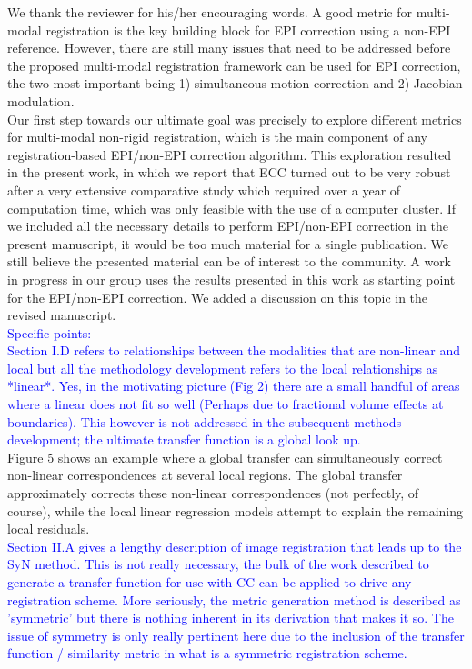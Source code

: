 \documentclass[onecolumn]{IEEEtran}
\begin{document}
We thank the reviewer for his/her encouraging words. A good metric for multi-modal registration is the key building block for EPI correction using a non-EPI reference. However, there are still many issues that need to be addressed before the proposed multi-modal registration framework can be used for EPI correction, the two most important being 1) simultaneous motion correction and 2) Jacobian modulation.\\

Our first step towards our ultimate goal was precisely to explore different metrics for multi-modal non-rigid registration, which is the main component of any registration-based EPI/non-EPI correction algorithm. This exploration resulted in the present work, in which we report that ECC turned out to be very robust after a very extensive comparative study which required over a year of computation time, which was only feasible with the use of a computer cluster. If we included all the necessary details to perform EPI/non-EPI correction in the present manuscript, it would be too much material for a single publication. We still believe the presented material can be of interest to the community. A work in progress in our group uses the results presented in this work as starting point for the EPI/non-EPI correction. We added a discussion on this topic in the revised manuscript.\\

\textcolor{blue}{Specific points:\\
Section I.D refers to relationships between the modalities that are non-linear and local but all the methodology development refers to the local relationships as *linear*. Yes, in the motivating picture (Fig 2) there are a small handful of areas where a linear does not fit so well (Perhaps due to fractional volume effects at boundaries). This however is not addressed in the subsequent methods development; the ultimate transfer function is a global look up.}\\

Figure 5 shows an example where a global transfer can simultaneously correct non-linear correspondences at several local regions. The global transfer approximately corrects these non-linear correspondences (not perfectly, of course), while the local linear regression models attempt to explain the remaining local residuals.\\

\textcolor{blue}{Section II.A gives a lengthy description of image registration that leads up to the SyN method. This is not really necessary, the bulk of the work described to generate a transfer function for use with CC can be applied to drive any registration scheme.
More seriously, the metric generation method is described as 'symmetric' but there is nothing inherent in its derivation that makes it so. The issue of symmetry is only really pertinent here due to the inclusion of the transfer function / similarity metric in what is a symmetric registration scheme.}
\end{document}
